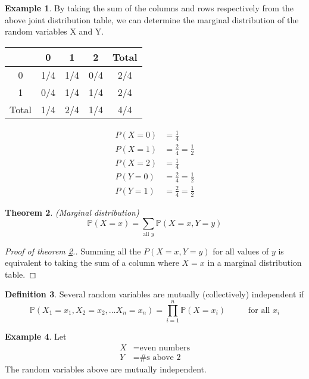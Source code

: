 \documentclass[12pt]{article}
\newcommand{\bbP}{\mathbb{P}}
\renewcommand{\_}[1]{\underline{ #1 }}
\newtheorem{theorem}{Theorem}[section]
\theoremstyle{definition}
\newtheorem{definition}[theorem]{Definition}
\newtheorem{example}[theorem]{Example}
\numberwithin{equation}{subsection}
\begin{document}
\begin{example}
	By taking the sum of the columns and rows respectively from the above joint distribution table, we can determine the marginal distribution of the random variables X and Y.
	\begin{center}
		\begin{tabular}{ c | c | c | c | c }
			& 0 & 1 & 2 & Total \\
			\hline
			0 & 1/4 & 1/4 & 0/4 & 2/4 \\
			\hline
			1 & 0/4 & 1/4 & 1/4 & 2/4 \\
			\hline
			Total & 1/4 & 2/4 & 1/4 & 4/4 \\
			\hline
		\end{tabular}
	\end{center}
	\begin{align*}
		P(X=0)&=\frac{1}{4} \\
		P(X=1)&=\frac{2}{4}=\frac{1}{2} \\
		P(X=2)&=\frac{1}{4} \\
		P(Y=0)&=\frac{2}{4}=\frac{1}{2} \\
		P(Y=1)&=\frac{2}{4}=\frac{1}{2}
	\end{align*}
\end{example}

\begin{theorem}\label{marginals} (Marginal distribution)
	\[\bbP(X=x)=\sum_{\text{all }y}\bbP(X=x,Y=y)\]
\end{theorem}

\begin{proof}[Proof of theorem \ref{marginals}.]
	Summing all the $P(X=x,Y=y)$ for all values of $y$ is equivalent to taking the sum of a column where $X=x$ in a marginal distribution table.
\end{proof}


\begin{definition}
	Several random variables are mutually (collectively) independent if \[ \bbP(X_1=x_1,X_2=x_2,\dots X_n=x_n)=\prod_{i=1}^{n}\bbP(X=x_i)\hspace{1cm} \text{ for all } x_i\]
\end{definition}

\begin{example}
 	Let
	\begin{align*}
		X&=\text{even numbers} \\
		Y&=\text{\#s above 2}
	\end{align*}
	The random variables above are mutually independent.
\end{example}
\end{document}
